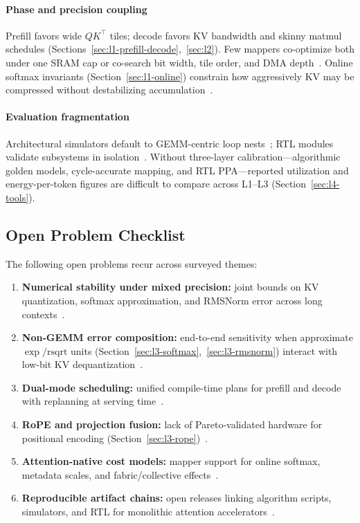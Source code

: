\documentclass[conference]{IEEEtran}
\begin{document}
\paragraph{Phase and precision coupling}
Prefill favors wide $QK^\top$ tiles; decode favors KV bandwidth and skinny matmul schedules (Sections~\ref{sec:l1-prefill-decode},~\ref{sec:l2}).
Few mappers co-optimize both under one SRAM cap or co-search bit width, tile order, and DMA depth~\cite{plena2025,flatattention2026,dao2023flashdecoding,batquant2026}.
Online softmax invariants (Section~\ref{sec:l1-online}) constrain how aggressively KV may be compressed without destabilizing accumulation~\cite{liu2024kivi,guaranteednorm2026}.

\paragraph{Evaluation fragmentation}
Architectural simulators default to GEMM-centric loop nests~\cite{parashar2019timeloop,scalesimv3_2025,klhufek2025transinfersim}; RTL modules validate subsystems in isolation~\cite{lin2025systolicattention,mive2026}.
Without three-layer calibration---algorithmic golden models, cycle-accurate mapping, and RTL PPA---reported utilization and energy-per-token figures are difficult to compare across L1--L3 (Section~\ref{sec:l4-tools}).

\subsection{Open Problem Checklist}
\label{sec:gaps-open}

The following open problems recur across surveyed themes:
\begin{enumerate}
  \item \textbf{Numerical stability under mixed precision:} joint bounds on KV quantization, softmax approximation, and RMSNorm error across long contexts~\cite{guaranteednorm2026,sole2025,batquant2026,ultraquant2026}.
  \item \textbf{Non-GEMM error composition:} end-to-end sensitivity when approximate $\exp/\mathrm{rsqrt}$ units (Section~\ref{sec:l3-softmax},~\ref{sec:l3-rmsnorm}) interact with low-bit KV dequantization~\cite{lin2025systolicattention,liu2024kivi,mive2026}.
  \item \textbf{Dual-mode scheduling:} unified compile-time plans for prefill and decode with replanning at serving time~\cite{plena2025,streamattention2025,dao2023flashdecoding}.
  \item \textbf{RoPE and projection fusion:} lack of Pareto-validated hardware for positional encoding (Section~\ref{sec:l3-rope})~\cite{su2024roformer,plena2025}.
  \item \textbf{Attention-native cost models:} mapper support for online softmax, metadata scales, and fabric/collective effects~\cite{flatattention2026,parashar2019timeloop,scalesimv3_2025}.
  \item \textbf{Reproducible artifact chains:} open releases linking algorithm scripts, simulators, and RTL for monolithic attention accelerators~\cite{plena2025,klhufek2025transinfersim,sawint42026}.
\end{enumerate}
\end{document}
